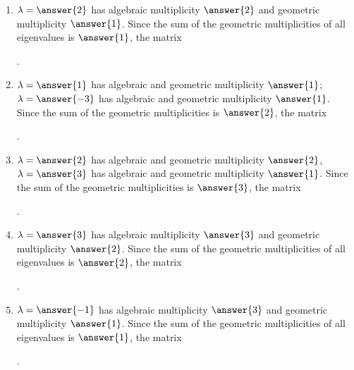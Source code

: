 \documentclass{ximera}
\begin{document}
\begin{problem}
  \begin{enumerate}
    \item $\eigenvar=\answer{2}$ has algebraic multiplicity $\answer{2}$ and geometric
      multiplicity $\answer{1}$. Since the sum of the geometric multiplicities of
      all eigenvalues is $\answer{1}$, the matrix
      \begin{multipleChoice}
      \end{multipleChoice}.
    \item $\eigenvar=\answer{1}$ has algebraic and geometric
      multiplicity $\answer{1}$; $\eigenvar=\answer{-3}$ has algebraic and geometric
      multiplicity $\answer{1}$. Since the sum of the geometric multiplicities is
      $\answer{2}$, the matrix
      \begin{multipleChoice}
      \end{multipleChoice}.
    \item $\eigenvar=\answer{2}$ has algebraic and geometric
      multiplicity $\answer{2}$, $\eigenvar=\answer{3}$ has algebraic and geometric
      multiplicity $\answer{1}$. Since the sum of the geometric multiplicities is
      $\answer{3}$, the matrix
      \begin{multipleChoice}
      \end{multipleChoice}.
    \item $\eigenvar=\answer{3}$ has algebraic multiplicity $\answer{3}$ and geometric
      multiplicity $\answer{2}$. Since the sum of the geometric multiplicities of
      all eigenvalues is $\answer{2}$, the matrix
      \begin{multipleChoice}
      \end{multipleChoice}.
    \item $\eigenvar = \answer{-1}$ has algebraic multiplicity $\answer{3}$ and geometric
      multiplicity $\answer{1}$. Since the sum of the geometric multiplicities of
      all eigenvalues is $\answer{1}$, the matrix
      \begin{multipleChoice}
      \end{multipleChoice}.
    \end{enumerate}

\end{problem}
\end{document}
